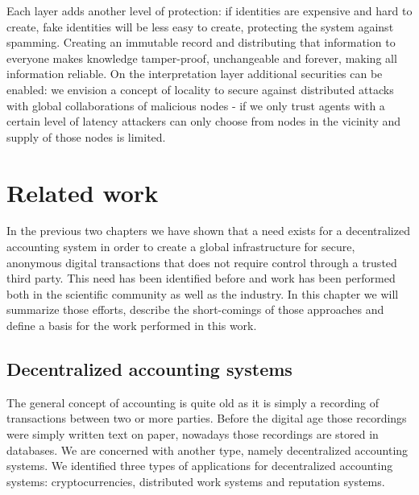 
Each layer adds another level of protection: if identities are expensive and hard to create, fake 
identities will be less easy to create, protecting the system against spamming. Creating an immutable
record and distributing that information to everyone makes knowledge tamper-proof, unchangeable and 
forever, making all information reliable. On the interpretation layer additional securities can be 
enabled: we envision a concept of locality to secure against distributed attacks with global 
collaborations of malicious nodes - if we only trust agents with a certain level of latency 
attackers can only choose from nodes in the vicinity and supply of those nodes is limited. 

\section{Related work}
In the previous two chapters we have shown that a need exists for a decentralized accounting system 
in order to create a global infrastructure for secure, anonymous digital transactions that does not 
require control through a trusted third party. This need has been identified before and work has 
been performed both in the scientific community as well as the industry. In this chapter we will 
summarize those efforts, describe the short-comings of those approaches and define a basis for the 
work performed in this work.

\subsection{Decentralized accounting systems}
The general concept of accounting is quite old as it is simply a recording of transactions between
two or more parties. Before the digital age those recordings were simply written text on paper, 
nowadays those recordings are stored in databases. We are concerned with another type, namely 
decentralized accounting systems. We identified three types of applications for decentralized 
accounting systems: cryptocurrencies, distributed work systems and reputation systems. 

